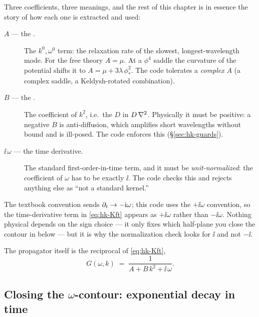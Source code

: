 Three coefficients, three meanings, and the rest of this chapter is in essence
the story of how each one is extracted and used:

\begin{description}
  \item[$A$ --- the .] The $k^0,\omega^0$ term: the relaxation rate
        of the slowest, longest-wavelength mode. For the free theory $A=\mu$.
        At a $\phi^4$ saddle the curvature of the potential shifts it to
        $A=\mu+3\lambda\,\phi_*^{2}$. The code tolerates a \emph{complex} $A$
        (a complex saddle, a Keldysh-rotated combination).
  \item[$B$ --- the .] The coefficient of $k^{2}$, i.e.\ the
        $D$ in $D\,\nabla^2$. Physically it must be positive: a negative $B$ is
        anti-diffusion, which amplifies short wavelengths without bound and is
        ill-posed. The code enforces this (\S\ref{sec:hk-guards}).
  \item[$\ii\,\omega$ --- the time derivative.] The standard \msrjd{}
        first-order-in-time term, and it must be \emph{unit-normalized}: the
        coefficient of $\omega$ has to be exactly $\ii$. The code checks this
        and rejects anything else as ``not a standard \msrjd{} kernel.''
\end{description}

\begin{note}
The textbook \msrjd{} convention sends $\partial_t \to -\mathrm{i}\omega$; this code uses the
$+\ii\omega$ convention, so the time-derivative term in \eqref{eq:hk-Kft}
appears as $+\ii\omega$ rather than $-\ii\omega$. Nothing physical depends on
the sign choice --- it only fixes which half-plane you close the contour in
below --- but it is why the normalization check looks for $\ii$ and not $-\ii$.
\end{note}

The propagator itself is the reciprocal of \eqref{eq:hk-Kft},
\begin{equation}
  G(\omega,k) \;=\; \frac{1}{A + B\,k^{2} + \ii\,\omega}.
  \label{eq:hk-Gft}
\end{equation}

\subsection{Closing the $\omega$-contour: exponential decay in time}

